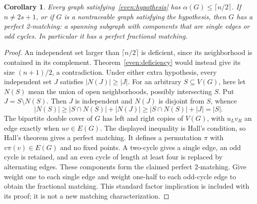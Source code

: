 \documentclass[11pt,a4paper]{article}
\newtheorem{corollary}[theorem]{Corollary}
\theoremstyle{definition}\newtheorem{definition}[theorem]{Definition}
\theoremstyle{remark}\newtheorem{remark}[theorem]{Remark}
\begin{document}
\begin{corollary}\label{even:factor}
Every graph satisfying~\eqref{even:hypothesis} has
$\alpha(G)\le\lceil n/2\rceil$. If $n\ne2s+1$, or if $G$ is a
nontraceable graph satisfying the hypothesis, then $G$ has a perfect
2-matching: a spanning subgraph with components that are single edges
or odd cycles. In particular it has a perfect fractional matching.
\end{corollary}
\begin{proof}
An independent set larger than $\lceil n/2\rceil$ is deficient, since
its neighborhood is contained in its complement. Theorem~\ref{even:deficiency}
would instead give its size $(n+1)/2$, a contradiction.
Under either extra hypothesis, every independent set $J$ satisfies
$|N(J)|\ge|J|$. For an arbitrary $S\subseteq V(G)$, here let $N(S)$
mean the union of open neighborhoods, possibly intersecting $S$.
Put $J=S\setminus N(S)$. Then $J$ is independent and $N(J)$ is
disjoint from $S$, whence
\[
 |N(S)|\ge |S\cap N(S)|+|N(J)|
 \ge |S\cap N(S)|+|J|=|S|.
\]
The bipartite double cover of $G$ has left and right copies of
$V(G)$, with $u_Lv_R$ an edge exactly when $uv\in E(G)$.
The displayed inequality is Hall's condition, so Hall's theorem
\cite{src:hall} gives a perfect matching. It defines a permutation
$\pi$ with $v\pi(v)\in E(G)$ and no fixed points. A two-cycle gives
a single edge, an odd cycle is retained, and an even cycle of length
at least four is replaced by alternating edges. These components form
the claimed perfect 2-matching. Give weight one to each single edge
and weight one-half to each odd-cycle edge to obtain the fractional
matching. This standard factor implication is included with its proof;
it is not a new matching characterization.
\end{proof}
\end{document}
